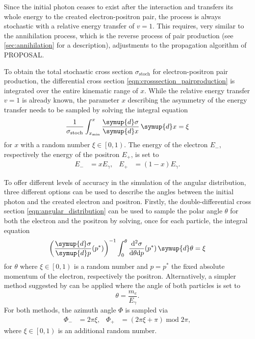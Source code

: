 Since the initial photon ceases to exist after the interaction and transfers its whole energy to the created electron-positron pair, the process is always stochastic with a relative energy transfer of $v=1$.
This requires, very similar to the annihilation process, which is the reverse process of pair production (see \ref{sec:annihilation} for a description), adjustments to the propagation algorithm of PROPOSAL.

To obtain the total stochastic cross section $\sigma_{\text{stoch}}$ for electron-positron pair production, the differential cross section \ref{eqn:crosssection_pairproduction} is integrated over the entire kinematic range of $x$.
While the relative energy transfer $v=1$ is already known, the parameter $x$ describing the asymmetry of the energy transfer needs to be sampled by solving the integral equation
%
\begin{equation}
	\frac{1}{\sigma_{\text{stoch}}} \int_{x_{\text{min}}}^{x} \frac{\symup{d}\sigma}{\symup{d}x} \, \symup{d}x = \xi
\end{equation}
%
for $x$ with a random number $\xi \in \left[0,1\right)$.
The energy of the electron $E_-$, respectively the energy of the positron $E_+$, is set to
%
\begin{align}
	E_- &= x E_{\gamma}, & E_+ &= (1-x) E_{\gamma}.
\end{align}
%

To offer different levels of accuracy in the simulation of the angular distribution, three different options can be used to describe the angles between the initial photon and the created electron and positron.
Firstly, the double-differential cross section \eqref{eqn:angular_distribution} can be used to sample the polar angle $\theta$ for both the electron and the positron by solving, once for each particle, the integral equation
%
\begin{equation}
	\label{eqn:angular_tsai}
    \left( \frac{\symup{d}\sigma}{\symup{d}p}(p^{\ast}) \right)^{-1} \int_{0}^{\theta} \frac{\mathrm{d}^2\sigma}{\mathrm{d}\theta \mathrm{d}p}(p^{\ast}) \, \symup{d}\theta = \xi
\end{equation}
%
for $\theta$ where $\xi \in \left[0,1\right)$ is a random number and $p = p^{\ast}$ the fixed absolute momentum of the electron, respectively the positron.
Alternatively, a simpler method suggested by \cite{Hirayama:2005zm} can be applied where the angle of both particles is set to
%
\begin{equation}
	\label{eqn:angular_egs}
	\theta = \frac{m_e}{E_{\gamma}}.
\end{equation}
%
For both methods, the azimuth angle $\Phi$ is sampled via
%
\begin{align}
	\Phi_{-} &= 2 \pi \xi, & \Phi_{+} &= (2 \pi \xi + \pi) \;\mathrm{mod}\; 2 \pi,
\end{align}
%
where $\xi \in \left[0,1\right)$ is an additional random number.

